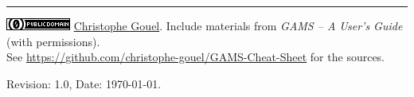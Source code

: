 \documentclass[10pt,landscape,a4paper]{article}
\begin{document}
\begin{multicols}{2}
\vspace{0.5cm}
\rule{3cm}{0.5pt}

\href{http://creativecommons.org/publicdomain/zero/1.0/}{\includegraphics[height=1.75ex]{CC0-small.png}}
\href{http://www.christophegouel.com}{Christophe Gouel}. Include materials from \emph{GAMS -- A User's Guide} (with permissions). \\
See \url{https://github.com/christophe-gouel/GAMS-Cheat-Sheet} for the sources.

Revision: 1.0, Date: \today{}.

\end{multicols}
\end{document}
